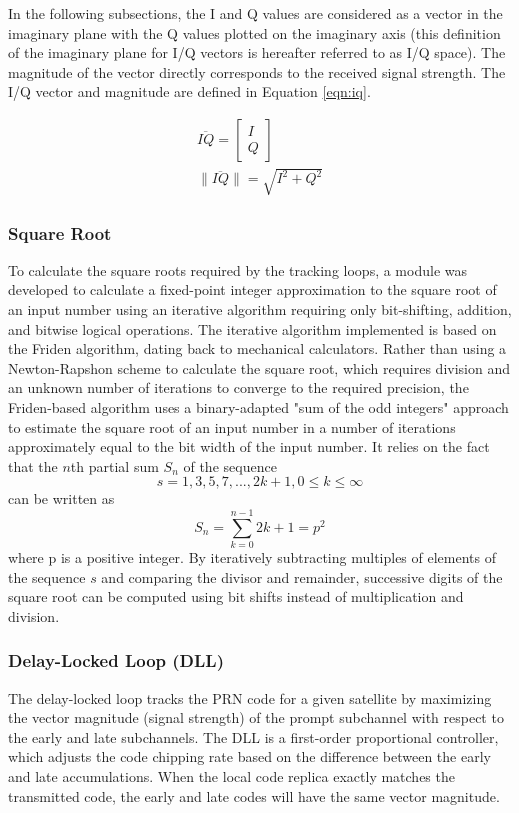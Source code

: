 \documentclass[12pt]{article}
\begin{document}
In the following subsections, the I and Q values are considered as a vector in the imaginary plane with the Q values plotted on the imaginary axis (this definition of the imaginary plane for I/Q vectors is hereafter referred to as I/Q space). The magnitude of the vector directly corresponds to the received signal strength. The I/Q vector and magnitude are defined in Equation \ref{eqn:iq}.

\begin{gather}
\label{eqn:iq}
\overline{IQ}=
\left[ \begin{matrix}
  I \\
  Q
\end{matrix} \right] \\
\lVert \overline{IQ} \rVert=\sqrt{I^2+Q^2} \nonumber
\end{gather}

\subsubsection{Square Root}
\label{sec:square root}
To calculate the square roots required by the tracking loops, a module was developed to calculate a fixed-point integer approximation to the square root of an input number using an iterative algorithm requiring only bit-shifting, addition, and bitwise logical operations. The iterative algorithm implemented is based on the Friden algorithm, dating back to mechanical calculators. \cite{crenshaw} Rather than using a Newton-Rapshon scheme to calculate the square root, which requires division and an unknown number of iterations to converge to the required precision, the Friden-based algorithm uses a binary-adapted "sum of the odd integers" approach to estimate the square root of an input number in a number of iterations approximately equal to the bit width of the input number. It relies on the fact that the $n$th partial sum $S_n$ of the sequence
\begin{equation*}
s = {1, 3, 5, 7, ..., 2k + 1}, 0 \leq k \leq \infty
\end{equation*}
can be written as
\begin{equation*}
S_n = \sum_{k = 0}^{n-1}2k+1 = p^2
\end{equation*}
where p is a positive integer. By iteratively subtracting multiples of elements of the sequence $s$ and comparing the divisor and remainder, successive digits of the square root can be computed using bit shifts instead of multiplication and division.

\subsubsection{Delay-Locked Loop (DLL)}
The delay-locked loop tracks the PRN code for a given satellite by maximizing the vector magnitude (signal strength) of the prompt subchannel with respect to the early and late subchannels. The DLL is a first-order proportional controller, which adjusts the code chipping rate based on the difference between the early and late accumulations. When the local code replica exactly matches the transmitted code, the early and late codes will have the same vector magnitude.
\end{document}
